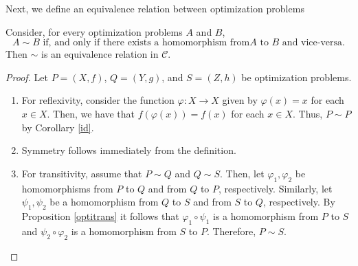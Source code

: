 \documentclass[a4paper]{article}
\begin{document}
Next, we define an equivalence relation between optimization problems


\begin{lemma}
Consider, for every optimization problems $A$ and $B$, $$A\sim B \text{ if, and
  only if  there exists a homomorphism from} A \text{ to } B \text{ and vice-versa.}$$
Then $\sim$ is an equivalence relation in \(\mathcal{C}\).

\end{lemma}

\begin{proof}

  Let $P=(X,f)$, $Q=(Y,g)$, and $S=(Z,h)$ be optimization problems.
\begin{enumerate}[label=(\roman*)]

\item For reflexivity, consider the function \mbox{$\varphi\colon X\to X$} given by
  $\varphi(x)=x$ for each $x\in X$. Then, we have that $f(\varphi(x))=f(x)$ for each
  $x\in X$. Thus, $P\sim P$ by Corollary \ref{id}.
  
\item Symmetry follows immediately from the definition.

\item For transitivity, assume that $P\sim Q$ and $Q\sim S$. Then, let
  $\varphi_1,\varphi_2$ be homomorphisms from $P$ to $Q$ and from $Q$ to $P$,
  respectively. Similarly, let $\psi_1,\psi_2$ be a homomorphism from $Q$ to $S$
  and from $S$ to $Q$, respectively. By Proposition \ref{optitrans} it follows
  that $\varphi_1\circ\psi_1$ is a homomorphism from $P$ to $S$ and
  $\psi_2\circ\varphi_2$ is a homomorphism from $S$ to $P$. Therefore, $P\sim
  S$.\qedhere
  \end{enumerate}

\end{proof}
\end{document}
